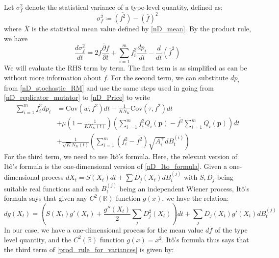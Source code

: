 Let $\sigma^2_{f}$ denote the statistical variance of a type-level quantity, defined as:
\begin{equation}
    \sigma^2_{f} \coloneqq \overline{(f^2)} - (\overline{f})^2
\end{equation}
where $\overline{X}$ is the statistical mean value defined by \eqref{nD_mean}. By the product rule, we have
\begin{equation}
\label{prod_rule_for_variances}
\frac{d\sigma^2_{f}}{dt} = 2\overline{f\frac{\partial f}{\partial t}} + \sum\limits_{i=1}^{m}f_i^2\frac{dp_i}{dt} - \frac{d}{dt}(\overline{f}^2)
\end{equation}
We will evaluate the RHS term by term. The first term is as simplified as can be without more information about $f$. For the second term, we can substitute $dp_i$ from \eqref{nD_stochastic_RM} and use the same steps used in going from \eqref{nD_replicator_mutator} to \eqref{nD_Price} to write
\begin{equation}
\label{2nd_term_for_variances}
\begin{aligned}
\sum\limits_{i=1}^{m}f_i^2dp_i &= \textrm{Cov}(w,f^2)dt - \frac{1}{KN_K}\textrm{Cov}(\tau,f^2)dt\\
&+ \mu\left(1-\frac{1}{KN_K(t)}\right)\left(\sum\limits_{i=1}^{m}f^2_iQ_i(\mathbf{p}) - \overline{f^2}\sum\limits_{i=1}^{m}Q_i(\mathbf{p})\right)dt \\
&+\frac{1}{\sqrt{K}N_{K}(t)}\left(\sum\limits_{i=1}^{m}\left(f^2_i - \overline{f^2}\right)\sqrt{A_i^+}dB_{t}^{(i)}\right)
\end{aligned}
\end{equation}
For the third term, we need to use It\^{o}'s formula. Here, the relevant version of It\^{o}'s formula is the one-dimensional version of \eqref{nD_Ito_formula}. Given a one-dimensional process $dX_t = S(X_t)dt + \sum D_j(X_t)dB^{(j)}_t$ with $S, D_j$ being suitable real functions and each $B^{(j)}_t$ being an independent Wiener process, It\^{o}'s formula says that given any $C^2(\mathbb{R})$ function $g(x)$, we have the relation:
\begin{equation}
\label{1D_Ito_formula}
dg(X_t) = \left(S(X_t)g'(X_t) + \frac{g''(X_t)}{2}\sum\limits_{j}D_j^2(X_t)\right)dt + \sum\limits_{j}D_j(X_t)g'(X_t)dB^{(j)}_t 
\end{equation}
In our case, we have a one-dimensional process for the mean value $d\overline{f}$ of the type level quantity, and the $C^2(\mathbb{R})$ function $g(x) = x^2$. It\^{o}'s formula thus says that the third term of \eqref{prod_rule_for_variances} is given by:
